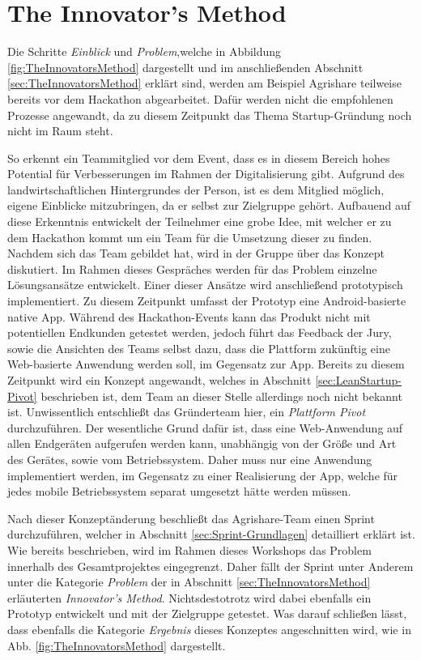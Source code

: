\section{The Innovator's Method}
Die Schritte \textit{Einblick} und \textit{Problem},welche in Abbildung \ref{fig:TheInnovatorsMethod} dargestellt und im anschließenden Abschnitt \ref{sec:TheInnovatorsMethod} erklärt sind, werden am Beispiel Agrishare teilweise bereits vor dem Hackathon abgearbeitet. Dafür werden nicht die empfohlenen Prozesse angewandt, da zu diesem Zeitpunkt das Thema Startup-Gründung noch nicht im Raum steht.

So erkennt ein Teammitglied vor dem Event, dass es in diesem Bereich hohes Potential für Verbesserungen im Rahmen der Digitalisierung gibt. Aufgrund des landwirtschaftlichen Hintergrundes der Person, ist es dem Mitglied möglich, eigene Einblicke mitzubringen, da er selbst zur Zielgruppe gehört. Aufbauend auf diese Erkenntnis entwickelt der Teilnehmer eine grobe Idee, mit welcher er zu dem Hackathon kommt um ein Team für die Umsetzung dieser zu finden. Nachdem sich das Team gebildet hat, wird in der Gruppe über das Konzept diskutiert. Im Rahmen dieses Gespräches werden für das Problem einzelne Lösungsansätze entwickelt. Einer dieser Ansätze wird anschließend prototypisch implementiert. Zu diesem Zeitpunkt umfasst der Prototyp eine Android-basierte native App. Während des Hackathon-Events kann das Produkt nicht mit potentiellen Endkunden getestet werden, jedoch führt das Feedback der Jury, sowie die Ansichten des Teams selbst dazu, dass die Plattform zukünftig eine Web-basierte Anwendung werden soll, im Gegensatz zur App. Bereits zu diesem Zeitpunkt wird ein Konzept angewandt, welches in Abschnitt \ref{sec:LeanStartup-Pivot} beschrieben ist, dem Team an dieser Stelle allerdings noch nicht bekannt ist. Unwissentlich entschließt das Gründerteam hier, ein \textit{Plattform Pivot} durchzuführen. Der wesentliche Grund dafür ist, dass eine Web-Anwendung auf allen Endgeräten aufgerufen werden kann, unabhängig von der Größe und Art des Gerätes, sowie vom Betriebssystem. Daher muss nur eine Anwendung implementiert werden, im Gegensatz zu einer Realisierung der App, welche für jedes mobile Betriebssystem separat umgesetzt hätte werden müssen.

Nach dieser Konzeptänderung beschließt das Agrishare-Team einen Sprint durchzuführen, welcher in Abschnitt \ref{sec:Sprint-Grundlagen} detailliert erklärt ist. Wie bereits beschrieben, wird im Rahmen dieses Workshops das Problem innerhalb des Gesamtprojektes eingegrenzt. Daher fällt der Sprint unter Anderem unter die Kategorie \textit{Problem} der in Abschnitt \ref{sec:TheInnovatorsMethod} erläuterten \textit{Innovator's Method}. Nichtsdestotrotz wird dabei ebenfalls ein Prototyp entwickelt und mit der Zielgruppe getestet. Was darauf schließen lässt, dass ebenfalls die Kategorie \textit{Ergebnis} dieses Konzeptes angeschnitten wird, wie in Abb. \ref{fig:TheInnovatorsMethod} dargestellt.